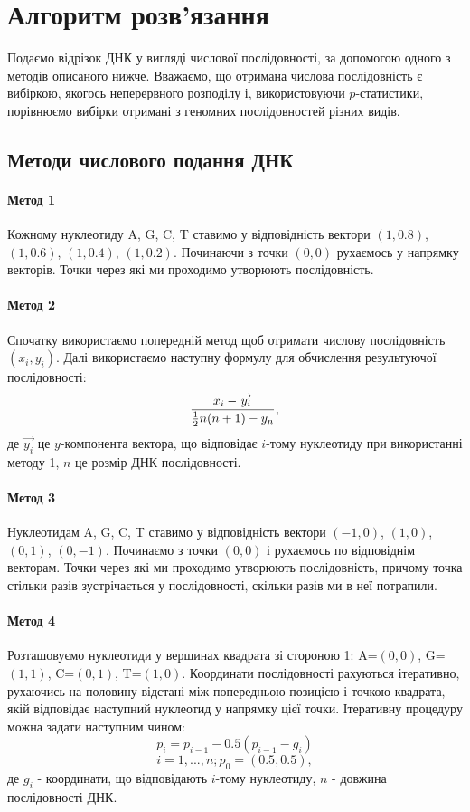 \documentclass[14pt,a4paper,titlepage]{extarticle}
\begin{document}
\section{Алгоритм розв’язання}
Подаємо відрізок ДНК у вигляді числової послідовності, за допомогою одного з
методів описаного нижче. Вважаємо, що отримана числова послідовність є вибіркою,
якогось неперервного розподілу і, використовуючи $p$-статистики, порівнюємо
вибірки отримані з геномних послідовностей різних видів.

\subsection{Методи числового подання ДНК}

\paragraph{Метод 1}
Кожному нуклеотиду A, G, C, T ставимо у відповідність вектори $(1,0.8)$, $(1,0.6)$, $(1,0.4)$, $(1,0.2)$. Починаючи з точки $(0,0)$ рухаємось у напрямку векторів. Точки через які ми проходимо утворюють послідовність.
\paragraph{Метод 2}
Спочатку використаємо попередній метод щоб отримати числову послідовність $(x_i,y_i)$. Далі використаємо наступну формулу для обчислення результуючої послідовності:
\[{x_i-\overrightarrow{y_i} \over{{1\over2}n(n+1)-y_n}},\]
де $\overrightarrow{y_i}$ це $y$-компонента вектора, що відповідає $i$-тому нуклеотиду при використанні методу 1, $n$ це розмір ДНК послідовності.
\paragraph{Метод 3}
Нуклеотидам A, G, C, T ставимо у відповідність вектори $(-1,0)$, $(1,0)$, $(0,1)$, $(0,-1)$. Починаємо з точки $(0,0)$ і рухаємось по відповіднім векторам. Точки через які ми проходимо утворюють послідовність, причому точка стільки разів зустрічається у послідовності, скільки разів ми в неї потрапили.
\paragraph{Метод 4}
Розташовуємо нуклеотиди у вершинах квадрата зі стороною 1: A=$(0,0)$, G=$(1,1)$, C=$(0,1)$, T=$(1,0)$. Координати послідовності рахуються ітеративно, рухаючись на половину відстані між попередньою позицією і точкою квадрата, якій відповідає наступний нуклеотид у напрямку цієї точки. Ітеративну процедуру можна задати наступним чином:
\[p_i = p_{i-1}-0.5(p_{i-1}-g_i)\]
\[i=1,...,n; p_0=(0.5,0.5),\]
де $g_i$ - координати, що відповідають $i$-тому нуклеотиду, $n$ - довжина послідовності ДНК.
\end{document}
